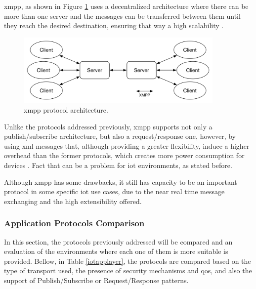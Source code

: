 \ac{xmpp}, as shown in Figure \ref{fig:xmpp} uses a decentralized architecture where there can be more than one server and the messages can be transferred between them until they reach the desired destination, ensuring that way a high scalability \cite{Al-fuqaha2015}.

\begin{figure}[H]
	\centering
	\includegraphics[width=0.9\textwidth]{figures/xmpp.png}
	\caption{\ac{xmpp} protocol architecture.}
	\label{fig:xmpp}
\end{figure}

Unlike the protocols addressed previously, \ac{xmpp} supports not only a publish/subscribe architecture, but also a request/response one, however, by using \ac{xml} messages that, although providing a greater flexibility, induce a higher overhead than the former protocols, which creates more power consumption for devices \cite{Salman2013}. Fact that can be a problem for \ac{iot} environments, as stated before.

Although \ac{xmpp} has some drawbacks, it still has capacity to be an important protocol in some specific \ac{iot} use cases, due to the near real time message exchanging and the high extensibility offered.

\subsubsection{Application Protocols Comparison}

In this section, the protocols previously addressed will be compared and an evaluation of the environments where each one of them is more suitable is provided. Bellow, in Table \ref{iotapplayer}, the protocols are compared based on the type of transport used, the presence of security mechanisms and \ac{qos}, and also the support of Publish/Subscribe or Request/Response patterns.


